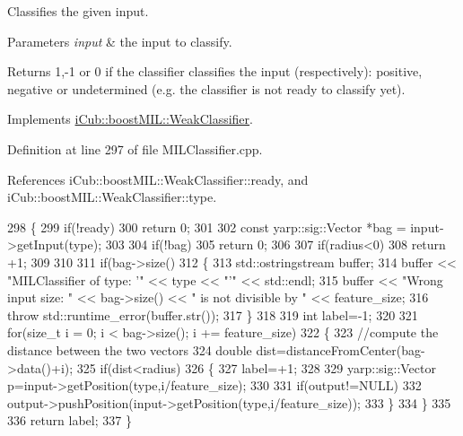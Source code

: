Classifies the given input. 


\begin{DoxyParams}{Parameters}
{\em input} & the input to classify. \\
\hline
\end{DoxyParams}
\begin{DoxyReturn}{Returns}
1,-\/1 or 0 if the classifier classifies the input (respectively)\+: positive, negative or undetermined (e.\+g. the classifier is not ready to classify yet). 
\end{DoxyReturn}


Implements \hyperlink{classiCub_1_1boostMIL_1_1WeakClassifier_a8a3fe3145859ef045f4b7e3f1a61d984}{i\+Cub\+::boost\+M\+I\+L\+::\+Weak\+Classifier}.



Definition at line 297 of file M\+I\+L\+Classifier.\+cpp.



References i\+Cub\+::boost\+M\+I\+L\+::\+Weak\+Classifier\+::ready, and i\+Cub\+::boost\+M\+I\+L\+::\+Weak\+Classifier\+::type.


\begin{DoxyCode}
298 \{
299     \textcolor{keywordflow}{if}(!ready)
300         \textcolor{keywordflow}{return} 0;
301 
302     \textcolor{keyword}{const} yarp::sig::Vector *bag = input->getInput(type);
303 
304     \textcolor{keywordflow}{if}(!bag)
305         \textcolor{keywordflow}{return} 0;
306 
307     \textcolor{keywordflow}{if}(radius<0)
308         \textcolor{keywordflow}{return} +1;
309 
310 
311     \textcolor{keywordflow}{if}(bag->size() %
312     \{
313         std::ostringstream buffer;
314         buffer << \textcolor{stringliteral}{"MILClassifier of type: '"} << type << \textcolor{stringliteral}{"'"} << std::endl;
315         buffer << \textcolor{stringliteral}{"Wrong input size: "} << bag->size() << \textcolor{stringliteral}{" is not divisible by "} << feature\_size;
316         \textcolor{keywordflow}{throw} std::runtime\_error(buffer.str());
317     \}
318 
319     \textcolor{keywordtype}{int} label=-1;
320 
321     \textcolor{keywordflow}{for}(\textcolor{keywordtype}{size\_t} i = 0; i < bag->size(); i += feature\_size)
322     \{
323         \textcolor{comment}{//compute the distance between the two vectors}
324         \textcolor{keywordtype}{double} dist=distanceFromCenter(bag->data()+i);
325         \textcolor{keywordflow}{if}(dist<radius)
326         \{
327             label=+1;
328                 
329             yarp::sig::Vector p=input->getPosition(type,i/feature\_size);           
330 
331             \textcolor{keywordflow}{if}(output!=NULL)
332                 output->pushPosition(input->getPosition(type,i/feature\_size));
333         \}
334     \}
335 
336     \textcolor{keywordflow}{return} label;
337 \}
\end{DoxyCode}

